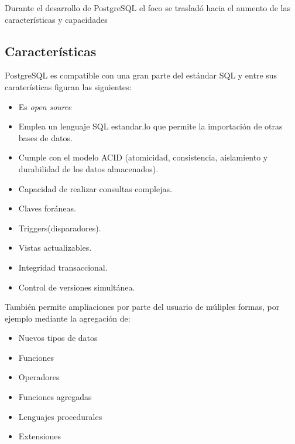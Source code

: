 Durante el desarrollo de PostgreSQL el foco se trasladó hacia el aumento de las características y capacidades 

\subsection{Características}
\label{sec:caracteristicas}

PostgreSQL es compatible con una gran parte del estándar SQL y entre sus caraterísticas figuran las siguientes: 
\begin{itemize}
\item Es \textit{open source}
\item Emplea un lenguaje SQL estandar.lo que permite la importación de otras bases de datos.
\item Cumple con el modelo ACID (atomicidad, consistencia, aislamiento y durabilidad de los datos almacenados).
\item Capacidad de realizar consultas complejas.
\item Claves foráneas.
\item Triggers(disparadores).
\item Vistas actualizables.
\item Integridad transaccional.
\item Control de versiones simultánea.
\end{itemize}

También permite ampliaciones por parte del usuario de múliples formas, por ejemplo mediante la agregación de:
\begin{itemize}
\item Nuevos tipos de datos 
\item Funciones 
\item Operadores 
\item Funciones agregadas 
\item Lenguajes procedurales 
\item Extensiones
\end{itemize}


